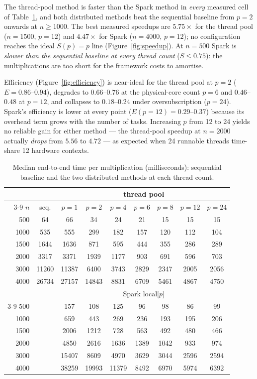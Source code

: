 \documentclass[11pt,a4paper]{article}
\begin{document}
The thread-pool method is faster than the Spark method in \emph{every}
measured cell of Table~\ref{tab:times}, and both distributed methods beat
the sequential baseline from $p = 2$ onwards at $n \ge 1000$. The best
measured speedups are $5.75\times$ for the thread pool ($n = 1500$,
$p = 12$) and $4.47\times$ for Spark ($n = 4000$, $p = 12$); no
configuration reaches the ideal $S(p) = p$ line
(Figure~\ref{fig:speedup}). At $n = 500$ Spark is \emph{slower than the
sequential baseline at every thread count} ($S \le 0.75$): the
multiplications are too short for the framework costs to amortise.

Efficiency (Figure~\ref{fig:efficiency}) is near-ideal for the thread pool
at $p = 2$ ($E = 0.86$--$0.94$), degrades to $0.66$--$0.76$ at the
physical-core count $p = 6$ and $0.46$--$0.48$ at $p = 12$, and collapses
to $0.18$--$0.24$ under oversubscription ($p = 24$). Spark's efficiency is
lower at every point ($E(p = 12) = 0.29$--$0.37$) because its overhead
term grows with the number of tasks. Increasing $p$ from 12 to 24 yields
no reliable gain for either method --- the thread-pool speedup at
$n = 2000$ actually \emph{drops} from $5.56$ to $4.72$ --- as expected
when 24 runnable threads time-share 12 hardware contexts.

\begin{table}[htbp]
\centering
\caption{Median end-to-end time per multiplication (milliseconds):
sequential baseline and the two distributed methods at each thread count.}
\label{tab:times}
\footnotesize
\begin{tabular}{rcccccccc}
\toprule
 & & \multicolumn{7}{c}{thread pool} \\
\cmidrule(lr){3-9}
$n$ & seq. & $p{=}1$ & $p{=}2$ & $p{=}4$ & $p{=}6$ & $p{=}8$ & $p{=}12$ & $p{=}24$ \\
\midrule
500  & 64 & 66 & 34 & 24 & 21 & 15 & 15 & 15 \\
1000 & 535 & 555 & 299 & 182 & 157 & 120 & 112 & 104 \\
1500 & 1644 & 1636 & 871 & 595 & 444 & 355 & 286 & 289 \\
2000 & 3317 & 3371 & 1939 & 1177 & 903 & 691 & 596 & 703 \\
3000 & 11260 & 11387 & 6400 & 3743 & 2829 & 2347 & 2005 & 2056 \\
4000 & 26734 & 27157 & 14843 & 8831 & 6709 & 5461 & 4867 & 4750 \\
\midrule
 & & \multicolumn{7}{c}{Spark local[$p$]} \\
\cmidrule(lr){3-9}
500  &  & 157 & 108 & 125 & 96 & 98 & 86 & 99 \\
1000 &  & 659 & 443 & 269 & 236 & 193 & 195 & 206 \\
1500 &  & 2006 & 1212 & 728 & 563 & 492 & 480 & 466 \\
2000 &  & 4850 & 2616 & 1636 & 1389 & 1042 & 933 & 974 \\
3000 &  & 15407 & 8609 & 4970 & 3629 & 3044 & 2596 & 2594 \\
4000 &  & 38259 & 19993 & 11379 & 8492 & 6970 & 5974 & 6392 \\
\bottomrule
\end{tabular}
\end{table}
\end{document}
